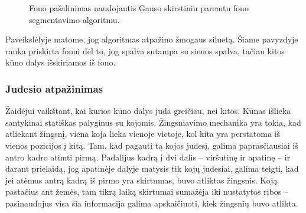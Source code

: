 \documentclass{VUMIFPSbakalaurinis}
\begin{document}
\begin{figure}[H]
    \centering
    \qquad
    \caption{Fono pašalinimas naudojantis Gauso skirstiniu paremtu fono segmentavimo algoritmu.}
    \label{fig:example}
\end{figure}


Paveikslėlyje matome, jog algoritmas atpažino žmogaus siluetą. Šiame pavyzdyje ranka priskirta fonui dėl to, jog spalva sutampa su sienos spalva, tačiau kitos kūno dalys išskiriamos iš fono.

\subsubsection{Judesio atpažinimas}\label{section:movement}

Žaidėjui vaikštant, kai kurios kūno dalys juda greičiau, nei kitos. Kūnas išlieka santykinai statiškas palyginus su kojomis. Žingsniavimo mechanika yra tokia, kad atliekant žingsnį, viena koja lieka vienoje vietoje, kol kita yra perstatoma iš vienos pozicijos į kitą. Tam, kad pagauti tą kojos judesį, galima paprasčiausiai iš antro kadro atimti pirmą. Padalijus kadrą į dvi dalis – viršutinę ir apatinę – ir darant prielaidą, jog apatinėje dalyje matysis tik kojų judesiai, galima teigti, kad jei atėmus antrą kadrą iš pirmo yra skirtumas, buvo atliktas žingsnis. Koją pastačius ant žemės, tam tikrą laiką skirtumai sumažėja iki nustatytos ribos – pasinaudojus visa šia informacija galima apskaičiuoti, kiek žingsnių buvo atlikta. 
\end{document}
